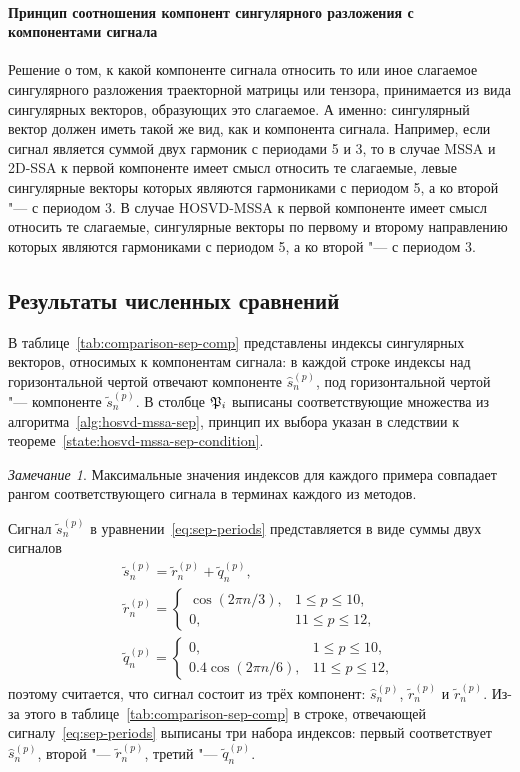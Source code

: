 \documentclass[specialist,
  substylefile=spbu.rtx,
subf,href,colorlinks=true, 12pt]{disser}
\theoremstyle{plain}
\theoremstyle{definition}
\theoremstyle{remark}
\newtheorem*{remark}{Замечание}
\begin{document}
\paragraph{Принцип соотношения компонент сингулярного разложения с компонентами сигнала}
\label{par:example-components-sep}
Решение о том, к какой компоненте сигнала относить то или иное слагаемое сингулярного разложения
траекторной матрицы или тензора, принимается из вида сингулярных векторов, образующих это слагаемое.
А именно: сингулярный вектор должен иметь такой же вид, как и компонента сигнала.
Например, если сигнал является суммой двух гармоник с периодами 5 и 3, то в случае MSSA и 2D-SSA
к первой компоненте имеет смысл относить те слагаемые, левые сингулярные векторы которых являются гармониками
с периодом 5, а ко второй "--- с периодом 3.
В случае HOSVD-MSSA к первой компоненте имеет смысл относить те слагаемые, сингулярные векторы по первому и
второму направлению которых являются гармониками с периодом 5, а ко второй "--- с периодом 3.


\subsection{Результаты численных сравнений}\label{subsec:numerical-comp-sep}
В таблице~\ref{tab:comparison-sep-comp} представлены индексы сингулярных векторов, относимых
к компонентам сигнала: в каждой строке индексы над горизонтальной чертой отвечают компоненте $\hat{s}_n^{(p)}$,
под горизонтальной чертой "--- компоненте $\tilde{s}_n^{(p)}$.
В столбце $\mathfrak{P}_i$ выписаны соответствующие множества из алгоритма~\ref{alg:hosvd-mssa-sep},
принцип их выбора указан в следствии к теореме~\ref{state:hosvd-mssa-sep-condition}.
\begin{remark}
  Максимальные значения индексов для каждого примера совпадает рангом соответствующего сигнала в терминах
  каждого из методов.
\end{remark}

Сигнал $\tilde{s}_n^{(p)}$ в уравнении~\eqref{eq:sep-periods} представляется в виде суммы двух сигналов
\begin{gather*}
  \tilde{s}_n^{(p)} = \tilde{r}_n^{(p)} + \tilde{q}_n^{(p)},\\
  \tilde{r}_n^{(p)} =
  \begin{cases}
    \cos(2\pi n /3), & 1 \leqslant p \leqslant 10,\\
    0, & 11 \leqslant p \leqslant 12,
  \end{cases} \\
  \tilde{q}_n^{(p)} =
  \begin{cases}
    0, & 1 \leqslant p \leqslant 10,\\
    0.4 \cos(2 \pi n / 6), & 11 \leqslant p \leqslant 12,
  \end{cases}
\end{gather*}
поэтому считается, что сигнал состоит из трёх компонент: $\hat{s}_n^{(p)}$, $\tilde{r}_n^{(p)}$ и
$\tilde{r}_n^{(p)}$.
Из-за этого в таблице~\ref{tab:comparison-sep-comp} в строке, отвечающей сигналу~\eqref{eq:sep-periods} выписаны
три набора индексов: первый соответствует $\hat{s}_n^{(p)}$, второй "--- $\tilde{r}_n^{(p)}$,
третий "--- $\tilde{q}_n^{(p)}$.
\end{document}
